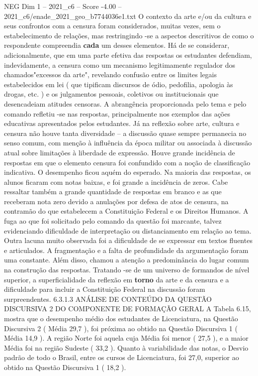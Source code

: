 \begin{textsample}{NEG Dim 1 – 2021\_c6 – Score -4.00 – 2021\_c6/enade\_2021\_geo\_b7744036e1.txt}
O contexto da arte e/ou da cultura e seus confrontos com a censura foram considerados, muitas vezes, sem o estabelecimento de relações, mas restringindo -se a aspectos descritivos de como o respondente compreendia \textbf{cada} um desses elementos.
Há de se considerar, adicionalmente, que em uma parte efetiva das respostas os estudantes defendiam, indevidamente, a censura como um mecanismo legitimamente regulador dos chamados"excessos da arte", revelando confusão entre os limites legais estabelecidos em lei ( que tipificam discursos de ódio, pedofilia, apologia às drogas, etc. ) e os julgamentos pessoais, coletivos ou institucionais que desencadeiam atitudes censoras.
A abrangência proporcionada pelo tema e pelo comando refletiu -se nas respostas, principalmente nos exemplos das ações educativas apresentados pelos estudantes.
Já na reflexão sobre arte, cultura e censura não houve tanta diversidade – a discussão quase sempre permanecia no senso comum, com menção à influência da época militar ou associada à discussão atual sobre limitações à liberdade de expressão.
Houve grande incidência de respostas em que o elemento censura foi confundido com a noção de classificação indicativa.
O desempenho ficou aquém do esperado.
Na maioria das respostas, os alunos ficaram com notas baixas, e foi grande a incidência de zeros.
Cabe ressaltar também a grande quantidade de respostas em branco e as que receberam nota zero devido a anulações por defesa de atos de censura, na contramão do que estabelecem a Constituição Federal e os Direitos Humanos.
A fuga ao que foi solicitado pelo comando da questão foi marcante, talvez evidenciando dificuldade de interpretação ou distanciamento em relação ao tema.
Outra lacuna muito observada foi a dificuldade de se expressar em textos fluentes e articulados.
A fragmentação e a falta de profundidade da argumentação foram uma constante.
Além disso, chamou a atenção a predominância do lugar comum na construção das respostas.
Tratando -se de um universo de formandos de nível superior, a superficialidade da reflexão em \textbf{torno} da arte e da censura e a dificuldade para incluir a Constituição Federal na discussão foram surpreendentes. 6.3.1.3 ANÁLISE DE CONTEÚDO DA QUESTÃO DISCURSIVA 2 DO COMPONENTE DE FORMAÇÃO GERAL A Tabela 6.15, mostra que o desempenho médio dos estudantes de Licenciatura, na Questão Discursiva 2 ( Média 29,7 ), foi próxima ao obtido na Questão Discursiva 1 ( Média 14,9 ).
A região Norte foi aquela cuja Média foi menor ( 27,5 ), e a maior Média foi na região Sudeste ( 33,2 ).
Quanto à variabilidade das notas, o Desvio padrão de todo o Brasil, entre os cursos de Licenciatura, foi 27,0, superior ao obtido na Questão Discursiva 1 ( 18,2 ).

\end{textsample}
